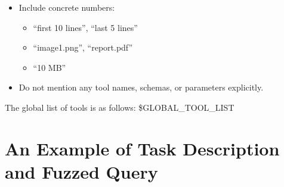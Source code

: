 \begin{ColorBlock}[Prompt]
\begin{itemize}[leftmargin=*, itemsep=2pt]
  \item Include concrete numbers:
    \begin{itemize}[itemsep=1pt]
      \item “first 10 lines”, “last 5 lines”
      \item “image1.png”, “report.pdf”
      \item “10 MB”
    \end{itemize}

  \item Do not mention any tool names, schemas, or parameters explicitly.
\end{itemize}
The global list of tools is as follows: \$GLOBAL\_TOOL\_LIST
\end{ColorBlock}

\section{An Example of Task Description and Fuzzed Query}
\label{appendix:task_description}
